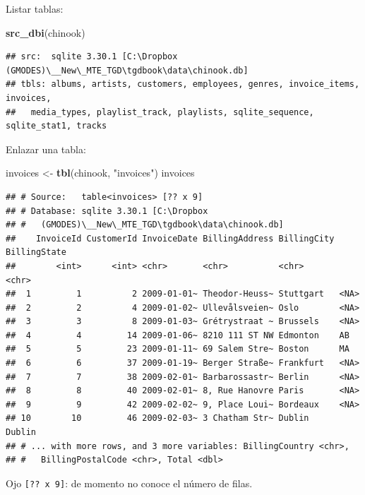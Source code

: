 \documentclass[]{book}
\newenvironment{Shaded}{\begin{snugshade}}{\end{snugshade}}
\newcommand{\KeywordTok}[1]{\textcolor[rgb]{0.13,0.29,0.53}{\textbf{#1}}}
\newcommand{\StringTok}[1]{\textcolor[rgb]{0.31,0.60,0.02}{#1}}
\newcommand{\NormalTok}[1]{#1}
\begin{document}
Listar tablas:

\begin{Shaded}
\begin{Highlighting}[]
\KeywordTok{src_dbi}\NormalTok{(chinook)}
\end{Highlighting}
\end{Shaded}

\begin{verbatim}
## src:  sqlite 3.30.1 [C:\Dropbox (GMODES)\__New\_MTE_TGD\tgdbook\data\chinook.db]
## tbls: albums, artists, customers, employees, genres, invoice_items, invoices,
##   media_types, playlist_track, playlists, sqlite_sequence, sqlite_stat1, tracks
\end{verbatim}

Enlazar una tabla:

\begin{Shaded}
\begin{Highlighting}[]
\NormalTok{invoices <-}\StringTok{ }\KeywordTok{tbl}\NormalTok{(chinook, }\StringTok{"invoices"}\NormalTok{)}
\NormalTok{invoices}
\end{Highlighting}
\end{Shaded}

\begin{verbatim}
## # Source:   table<invoices> [?? x 9]
## # Database: sqlite 3.30.1 [C:\Dropbox
## #   (GMODES)\__New\_MTE_TGD\tgdbook\data\chinook.db]
##    InvoiceId CustomerId InvoiceDate BillingAddress BillingCity BillingState
##        <int>      <int> <chr>       <chr>          <chr>       <chr>       
##  1         1          2 2009-01-01~ Theodor-Heuss~ Stuttgart   <NA>        
##  2         2          4 2009-01-02~ Ullevålsveien~ Oslo        <NA>        
##  3         3          8 2009-01-03~ Grétrystraat ~ Brussels    <NA>        
##  4         4         14 2009-01-06~ 8210 111 ST NW Edmonton    AB          
##  5         5         23 2009-01-11~ 69 Salem Stre~ Boston      MA          
##  6         6         37 2009-01-19~ Berger Straße~ Frankfurt   <NA>        
##  7         7         38 2009-02-01~ Barbarossastr~ Berlin      <NA>        
##  8         8         40 2009-02-01~ 8, Rue Hanovre Paris       <NA>        
##  9         9         42 2009-02-02~ 9, Place Loui~ Bordeaux    <NA>        
## 10        10         46 2009-02-03~ 3 Chatham Str~ Dublin      Dublin      
## # ... with more rows, and 3 more variables: BillingCountry <chr>,
## #   BillingPostalCode <chr>, Total <dbl>
\end{verbatim}

Ojo \texttt{{[}??\ x\ 9{]}}: de momento no conoce el número de filas.
\end{document}
